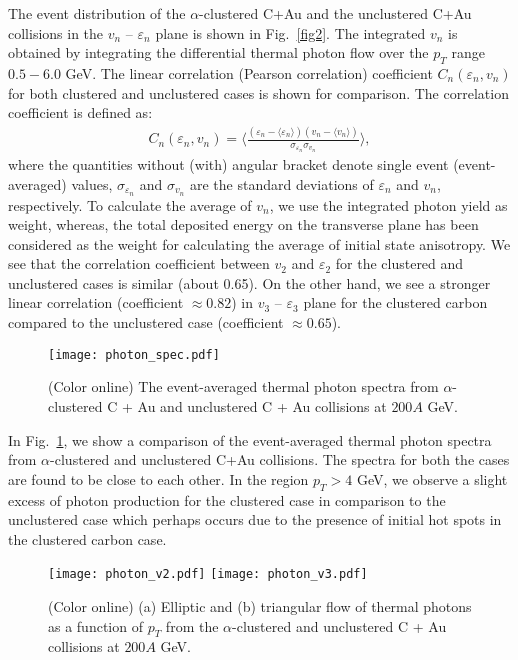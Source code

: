 \documentclass[aps,prc,twocolumn,floatfix,12pts,superscriptaddress]{revtex4}
\begin{document}
The event distribution of the $\alpha$-clustered C+Au and the unclustered C+Au collisions in the $v_n$ -- $\varepsilon_n$ plane is shown in  Fig.~\ref{fig2}. The integrated $v_n$ is obtained by integrating the differential thermal photon flow over the  $p_T$ range $0.5 - 6.0$ GeV. The linear correlation  (Pearson correlation) coefficient $C_n(\varepsilon_n,v_n)$ for both clustered and unclustered cases is shown for comparison.  The correlation coefficient is defined as:
\begin{eqnarray}
C_n(\varepsilon_n,v_n)=\bigg\langle \frac{(\varepsilon_n-\langle \varepsilon_n\rangle)(v_n-\langle v_n\rangle)}{\sigma_{\varepsilon_n} \sigma_{v_n}}\bigg\rangle,
\end{eqnarray}
where the quantities without (with) angular bracket denote single event (event-averaged) values, $\sigma_{\varepsilon_n}$ and $\sigma_{v_n}$ are the standard deviations of $\varepsilon_n$ and $v_n$, respectively. To calculate the average of $v_n$, we use the integrated photon yield as weight, whereas, the total deposited energy on the transverse plane has been considered as the weight for calculating the average of initial state anisotropy. We see that the correlation coefficient between $v_2$ and $\varepsilon_2$ for the clustered and unclustered cases is similar (about 0.65).  On the other hand, we see a stronger linear correlation  (coefficient $\approx 0.82$) in $v_3$ -- $\varepsilon_3$ plane for the clustered carbon compared to the unclustered case (coefficient $\approx 0.65$). \\

  \begin{figure}[htbp!]
	\centerline{\texttt{[image: photon\_spec.pdf]}}
	\caption{(Color online) The event-averaged thermal photon spectra from $\alpha$-clustered C + Au and unclustered C + Au collisions at $200A$ GeV.}
	\label{fig3}
\end{figure}


In Fig.~\ref{fig3}, we show a comparison of the event-averaged thermal photon spectra from $\alpha$-clustered and unclustered C+Au collisions. The spectra for both the cases are found to be close to each other. In the region $ p_T > 4$ GeV, we observe a slight excess of photon production for the clustered case in comparison to the unclustered case which perhaps occurs due to the presence of initial hot spots in the clustered carbon case.\\


\begin{figure}[htbp!]
	\centering
	{\texttt{[image: photon\_v2.pdf]}}
	{\texttt{[image: photon\_v3.pdf]}}
	\vspace{-3mm}
	\caption {(Color online) (a) Elliptic and (b) triangular flow of thermal photons as a function of $p_T$ from the  $\alpha$-clustered and unclustered C + Au collisions at $200A$ GeV.}
	\label{fig4}
\end{figure}
\end{document}
